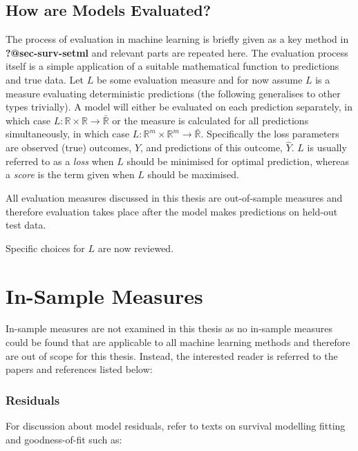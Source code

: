 \documentclass[
  letterpaper,
]{scrbook}
\theoremstyle{plain}
\theoremstyle{definition}
\theoremstyle{remark}
\begin{document}
\hypertarget{how-are-models-evaluated}{%
\subsection{How are Models Evaluated?}\label{how-are-models-evaluated}}

The process of evaluation in machine learning is briefly given as a key
method in \textbf{?@sec-surv-setml} and relevant parts are repeated
here. The evaluation process itself is a simple application of a
suitable mathematical function to predictions and true data. Let \(L\)
be some evaluation measure and for now assume \(L\) is a measure
evaluating deterministic predictions (the following generalises to other
types trivially). A model will either be evaluated on each prediction
separately, in which case
\(L: \mathbb{R}\times \mathbb{R}\rightarrow \bar{\mathbb{R}}\) or the
measure is calculated for all predictions simultaneously, in which case
\(L: \mathbb{R}^m \times \mathbb{R}^m \rightarrow \bar{\mathbb{R}}\).
Specifically the loss parameters are observed (true) outcomes, \(Y\),
and predictions of this outcome, \(\hat{Y}\). \(L\) is usually referred
to as a \emph{loss} when \(L\) should be minimised for optimal
prediction, whereas a \emph{score} is the term given when \(L\) should
be maximised.

All evaluation measures discussed in this thesis are out-of-sample
measures and therefore evaluation takes place after the model makes
predictions on held-out test data.

Specific choices for \(L\) are now reviewed.

\hypertarget{sec-eval-insample}{%
\section{In-Sample Measures}\label{sec-eval-insample}}

In-sample measures are not examined in this thesis as no in-sample
measures could be found that are applicable to all machine learning
methods and therefore are out of scope for this thesis. Instead, the
interested reader is referred to the papers and references listed below:

\hypertarget{residuals}{%
\subsubsection*{Residuals}\label{residuals}}

For discussion about model residuals, refer to texts on survival
modelling fitting and goodness-of-fit such as:
\end{document}
